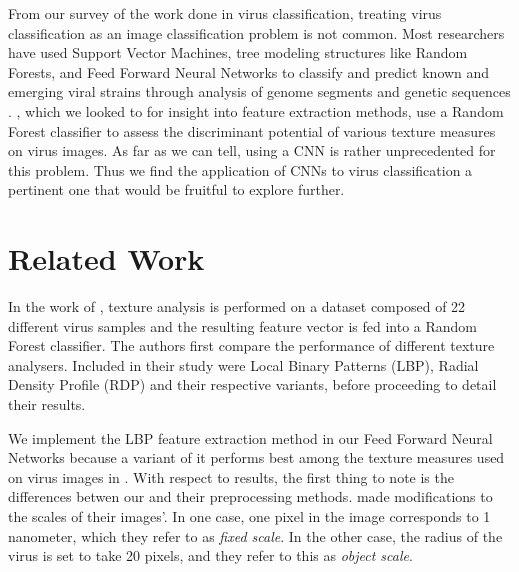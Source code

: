 \begin{multicols}{2}
From our survey of the work done in virus classification, treating virus classification as an image classification problem is not common. Most researchers have used Support Vector Machines, tree modeling structures like Random Forests, and Feed Forward Neural Networks to classify and predict known and emerging viral strains through analysis of genome segments and genetic sequences \citet{work_A} \citet{work_B} \citet{work_C}. \citet{kylberg2011virus}, which we looked to for insight into feature extraction methods, use a Random Forest classifier to assess the discriminant potential of various texture measures on virus images. As far as we can tell, using a CNN is rather unprecedented for this problem. Thus we find the application of CNNs to virus classification a pertinent one that would be fruitful to explore further.


\section{Related Work}
In the work of \citet{kylberg2011virus}, texture analysis is performed on a dataset composed of 22 different  virus samples and the resulting feature vector is fed into a Random Forest classifier. The authors first compare the performance of different texture analysers. Included in their study were Local Binary Patterns (LBP), Radial Density Profile (RDP) and their respective variants, before proceeding to detail their results. 

We implement the LBP feature extraction method in our Feed Forward Neural Networks because a variant of it performs best among the texture measures used on virus images in \citet{kylberg2011virus}. With respect to \citet{kylberg2011virus} results, the first thing to note is the differences betwen our and their preprocessing methods. \citet{kylberg2011virus} made modifications to the scales of their images'. In one case, one pixel in the image corresponds to 1 nanometer, which they refer to as \emph{fixed scale}. In the other case, the radius of the virus is set to take 20 pixels, and they refer to this as \emph{object scale}. 


\end{multicols}
